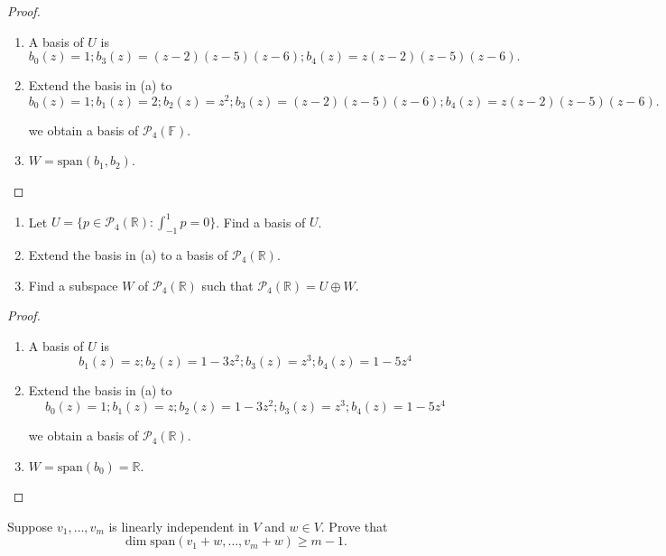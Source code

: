 \begin{proof}
    \begin{enumerate}[label={(\alph*)}]
        \item A basis of $U$ is
              \[
                  b_{0}(z) = 1; b_{3}(z) = (z-2)(z-5)(z-6); b_{4}(z) = z(z-2)(z-5)(z-6).
              \]
        \item Extend the basis in (a) to
              \[
                  b_{0}(z) = 1; b_{1}(z) = 2; b_{2}(z) = z^{2}; b_{3}(z) = (z-2)(z-5)(z-6); b_{4}(z) = z(z-2)(z-5)(z-6).
              \]

              we obtain a basis of $\mathcal{P}_{4}(\mathbb{F})$.
        \item $W = \text{span}(b_{1}, b_{2})$.
    \end{enumerate}
\end{proof}

\begin{exercise}
    \begin{enumerate}[label={(\alph*)}]
        \item Let $U = \{ p\in\mathcal{P}_{4}(\mathbb{R}): \int^{1}_{-1}p = 0 \}$. Find a basis of $U$.
        \item Extend the basis in (a) to a basis of $\mathcal{P}_{4}(\mathbb{R})$.
        \item Find a subspace $W$ of $\mathcal{P}_{4}(\mathbb{R})$ such that $\mathcal{P}_{4}(\mathbb{R}) = U\oplus W$.
    \end{enumerate}
\end{exercise}

\begin{proof}
    \begin{enumerate}[label={(\alph*)}]
        \item A basis of $U$ is
              \[
                  b_{1}(z) = z; b_{2}(z) = 1 - 3z^{2}; b_{3}(z) = z^{3}; b_{4}(z) = 1 - 5z^{4}
              \]
        \item Extend the basis in (a) to
              \[
                  b_{0}(z) = 1; b_{1}(z) = z; b_{2}(z) = 1 - 3z^{2}; b_{3}(z) = z^{3}; b_{4}(z) = 1 - 5z^{4}
              \]

              we obtain a basis of $\mathcal{P}_{4}(\mathbb{R})$.
        \item $W = \text{span}(b_{0}) = \mathbb{R}$.
    \end{enumerate}
\end{proof}

\begin{exercise}
    Suppose $v_{1}, \ldots, v_{m}$ is linearly independent in $V$ and $w \in V$. Prove that
    \[
        \dim\text{span}(v_{1} + w, \ldots, v_{m} + w)\geq m - 1.
    \]
\end{exercise}

